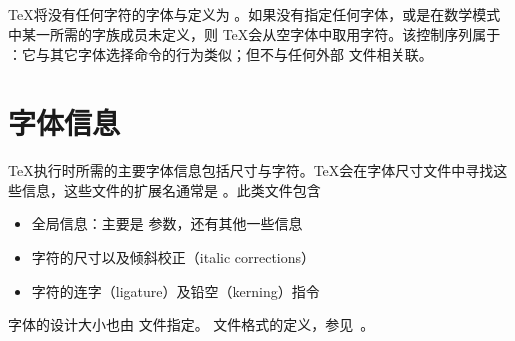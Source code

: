 \documentclass{book}
\begin{document}
\subsection{}

\TeX 将没有任何字符的字体与定义为 。如果没有指定任何字体，或是在数学模式中某一所需的字族成员未定义，则 \TeX 会从空字体中取用字符。该控制序列属于 ：它与其它字体选择命令的行为类似；但不与任何外部  文件相关联。

\section{字体信息}

\TeX 执行时所需的主要字体信息包括尺寸与字符。\TeX 会在字体尺寸文件中寻找这些信息，这些文件的扩展名通常是 。此类文件包含
\begin{itemize}
\item 全局信息：主要是  参数，还有其他一些信息
\item 字符的尺寸以及倾斜校正（italic corrections）
\item 字符的连字（ligature）及铅空（kerning）指令 %
\end{itemize}
字体的设计大小也由  文件指定。 文件格式的定义，参见~\cite{Knuth:TeXprogram}。
\end{document}
